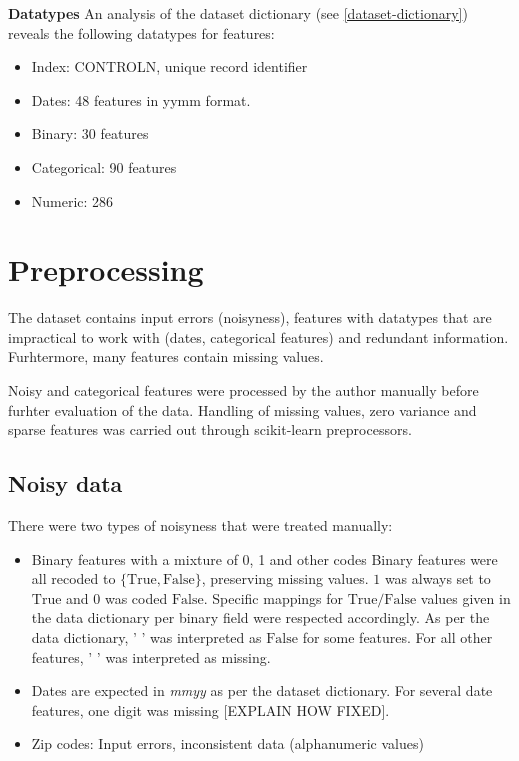 \documentclass[
  11pt,
  a4paper,
  DIV=12,captions=tableheading,oneside]{scrbook}
\providecommand{\tightlist}{%
  \setlength{\itemsep}{0pt}\setlength{\parskip}{0pt}}
\providecommand{\tightlist}{%
  \setlength{\itemsep}{0pt}\setlength{\parskip}{0pt}}
\begin{document}
\textbf{Datatypes}
An analysis of the dataset dictionary (see \ref{dataset-dictionary}) reveals the following datatypes for features:

\begin{itemize}
\tightlist
\item
  Index: CONTROLN, unique record identifier
\item
  Dates: 48 features in yymm format.
\item
  Binary: 30 features
\item
  Categorical: 90 features
\item
  Numeric: 286
\end{itemize}

\hypertarget{preprocessing}{%
\section{Preprocessing}\label{preprocessing}}

The dataset contains input errors (noisyness), features with datatypes that are impractical to work with (dates, categorical features) and redundant information. Furhtermore, many features contain missing values.

Noisy and categorical features were processed by the author manually before furhter evaluation of the data.
Handling of missing values, zero variance and sparse features was carried out through scikit-learn preprocessors.

\hypertarget{noisy-data}{%
\subsection{Noisy data}\label{noisy-data}}

There were two types of noisyness that were treated manually:

\begin{itemize}
\item
  Binary features with a mixture of 0, 1 and other codes
  Binary features were all recoded to \(\{\text{True},\text{False}\}\), preserving missing values. \(1\) was always set to \(\text{True}\) and \(0\) was coded \(\text{False}\). Specific mappings for \(\text{True} / \text{False}\) values given in the data dictionary per binary field were respected accordingly. As per the data dictionary, \(\text{' '}\) was interpreted as \(\text{False}\) for some features. For all other features, \(\text{' '}\) was interpreted as missing.
\item
  Dates are expected in \emph{mmyy} as per the dataset dictionary. For several date features, one digit was missing {[}EXPLAIN HOW FIXED{]}.
\item
  Zip codes: Input errors, inconsistent data (alphanumeric values)
\end{itemize}
\end{document}
